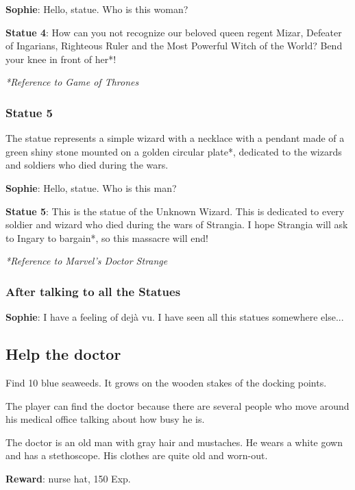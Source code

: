 \textbf{Sophie}: Hello, statue. Who is this woman?

\textbf{Statue 4}: How can you not recognize our beloved queen regent Mizar, Defeater of Ingarians, Righteous Ruler and the Most Powerful Witch of the World? Bend your knee in front of her*!

\textit{*Reference to Game of Thrones\texttrademark}
\subsubsection*{Statue 5}
The statue represents a simple wizard with a necklace with a pendant made of a green shiny stone mounted on a golden circular plate*, dedicated to the wizards and soldiers who died during the wars.

\textbf{Sophie}: Hello, statue. Who is this man?

\textbf{Statue 5}: This is the statue of the Unknown Wizard. This is dedicated to every soldier and wizard who died during the wars of Strangia. I hope Strangia will ask to Ingary to bargain*, so this massacre will end!

\textit{*Reference to Marvel\texttrademark 's Doctor Strange}
\subsubsection*{After talking to all the Statues}
\textbf{Sophie}: I have a feeling of dejà vu. I have seen all this statues somewhere else...

\subsection{Help the doctor}
Find 10 blue seaweeds. It grows on the wooden stakes of the docking points.

The player can find the doctor because there are several people who move around his medical office talking about how busy he is.

The doctor is an old man with gray hair and mustaches. He wears a white gown and has a stethoscope. His clothes are quite old and worn-out.

\textbf{Reward}: nurse hat, 150 Exp.


